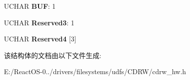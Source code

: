 \begin{DoxyCompactItemize}
U\+C\+H\+AR {\bfseries B\+UF}\+: 1
\item 
\mbox{\label{struct___d_v_d___r___r_w___w_r_i_t_e___d_e_s_c_r_i_p_t_o_r_a67888dc85630385044e04858eaa83625}} 
U\+C\+H\+AR {\bfseries Reserved3}\+: 1
\item 
\mbox{\label{struct___d_v_d___r___r_w___w_r_i_t_e___d_e_s_c_r_i_p_t_o_r_af80ad7468767f427f14999a527e4ab13}} 
U\+C\+H\+AR {\bfseries Reserved4} \mbox{[}3\mbox{]}
\end{DoxyCompactItemize}


该结构体的文档由以下文件生成\+:\begin{DoxyCompactItemize}
\item 
E\+:/\+React\+O\+S-\/0../drivers/filesystems/udfs/\+C\+D\+R\+W/cdrw\+\_\+hw.\+h\end{DoxyCompactItemize}
